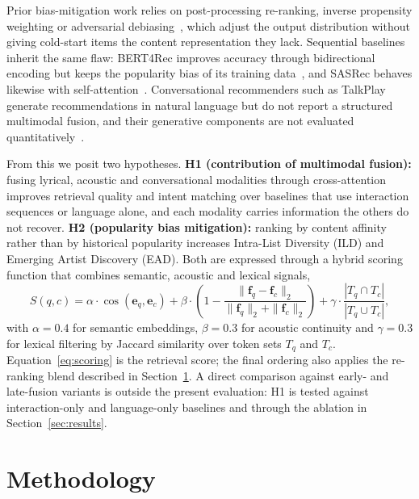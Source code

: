 \documentclass[]{ceurart}
\newcommand{\vect}[1]{\boldsymbol{#1}}
\newcommand{\cosine}{\operatorname{cos}}
\begin{document}
Prior bias-mitigation work relies on post-processing re-ranking, inverse
propensity weighting or adversarial
debiasing~\cite{kaminskas2016diversity}, which adjust the output distribution
without giving cold-start items the content representation they lack. Sequential
baselines inherit the same flaw: BERT4Rec improves accuracy through
bidirectional encoding but keeps the popularity bias of its training
data~\cite{sun2019bert4rec}, and SASRec behaves likewise with
self-attention~\cite{kang2018self}. Conversational recommenders such as TalkPlay
generate recommendations in natural language but do not report a structured
multimodal fusion, and their generative components are not evaluated
quantitatively~\cite{choi2025talkplaydata2,gao2021advances}.

From this we posit two hypotheses. \textbf{H1 (contribution of multimodal
fusion):} fusing lyrical, acoustic and conversational modalities through
cross-attention improves retrieval quality and intent matching over baselines
that use interaction sequences or language alone, and each modality carries
information the others do not recover. \textbf{H2 (popularity bias mitigation):}
ranking by content affinity rather than by historical popularity increases
Intra-List Diversity (ILD) and Emerging Artist Discovery (EAD). Both are
expressed through a hybrid scoring function that combines semantic, acoustic
and lexical signals,
\begin{equation}
S(q,c) = \alpha \cdot \cosine(\vect{e}_q, \vect{e}_c)
       + \beta \cdot \left(1 - \frac{\|\vect{f}_q - \vect{f}_c\|_2}
       {\|\vect{f}_q\|_2 + \|\vect{f}_c\|_2}\right)
       + \gamma \cdot \frac{|T_q \cap T_c|}{|T_q \cup T_c|},
\label{eq:scoring}
\end{equation}
with $\alpha=0.4$ for semantic embeddings, $\beta=0.3$ for acoustic continuity
and $\gamma=0.3$ for lexical filtering by Jaccard similarity over token sets
$T_q$ and $T_c$. Equation~\eqref{eq:scoring} is the retrieval score; the final
ordering also applies the re-ranking blend described in
Section~\ref{sec:methodology}. A direct comparison against early- and
late-fusion variants is outside the present evaluation: H1 is tested against
interaction-only and language-only baselines and through the ablation in
Section~\ref{sec:results}.

\section{Methodology}
\label{sec:methodology}
\end{document}
